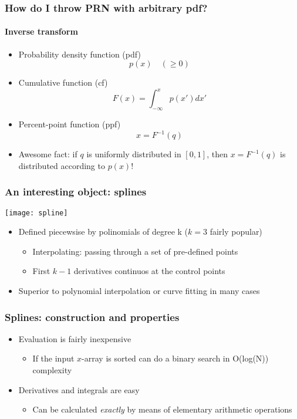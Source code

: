 \documentclass[9pt]{beamer}
\begin{document}
\begin{frame}
  \frametitle{How do I throw PRN with arbitrary pdf?}
  \framesubtitle{Inverse transform}
  \begin{itemize}
  \item Probability density function (pdf)
    $$
    p(x) \quad (\ge 0)
    $$
  \item Cumulative function (cf)
    $$
    F(x) = \int_{-\infty}^{x} p(x') dx'
    $$
  \item Percent-point function (ppf)
    $$
    x = F^{-1}(q)
    $$
  \item \alert{Awesome fact: if $q$ is uniformly distributed in $[0, 1]$,
    then $x = F^{-1}(q)$ is distributed according to $p(x)$!}
  \end{itemize}
\end{frame}


\begin{frame}
  \frametitle{An interesting object: splines}
  \centering\texttt{[image: spline]}

  \begin{itemize}
  \item Defined piecewsise by polinomials of degree k ($k = 3$ fairly popular)
    \begin{itemize}
    \item Interpolating: passing through a set of pre-defined points
    \item First $k-1$ derivatives continuos at the control points
    \end{itemize}
  \item Superior to polynomial interpolation or curve fitting in many cases
  \end{itemize}
\end{frame}


\begin{frame}
  \frametitle{Splines: construction and properties}
  

  \begin{itemize}
  \item Evaluation is fairly inexpensive
    \begin{itemize}
    \item If the input $x$-array is sorted can do a binary search in
      \alert{O(log(N)) complexity}
    \end{itemize}
  \item Derivatives and integrals are easy
    \begin{itemize}
    \item Can be calculated \emph{exactly} by means of elementary
      arithmetic operations
    \end{itemize}
  \end{itemize}
\end{frame}
\end{document}
